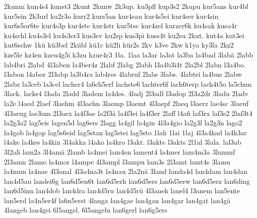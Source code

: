 {    2kunm
    kun4s4
    kunst3
    2kunt
    2kunw
    2k3up.
    ku3pfl
    kup3s2
    2kupu
    kur5ans
    kur4bl
    kur5ein
    2k3url
    ku2r3o
    kurr2
    kurs5an
    kur4sau
    kur4s5ei
    kur4ser
    kur4sin
    kur6s5or6te
    kur4s3p
    kur4ste
    kur4str
    kur5tsc
    kur4zel
    kurzer6k
    ku4sak
    kusa4r
    ku4schl
    ku4s3el
    ku4s3er3
    kus3ev
    ku2sp
    kus3pi
    kuss4t
    ku2su
    2kut.
    kut4a
    kut3ei
    kut6schw
    1kü
    kü3bel
    2kübl
    kü1c
    kü2li
    kür2s
    2kv
    k3ve
    2kw
    k1ya
    ky3la
    2kz2
    kze5le
    kz4en
    kzeu4g5i
    k3zu
    kzue4r3
    1la.
    1laa
    la3ar
    la3at
    la3ba
    la4bad
    3labä
    2labb
    lab4bri
    2labd
    4l3aben
    la4ber4z
    2labf
    2labg
    2labh
    l3a4b3i4t
    2la2bl
    2labn
    l3a4bo.
    l3abon
    l4abor
    2l3abp
    la3b4ra
    lab4res
    4labruf
    2labs
    3labs.
    4labtei
    la4bus
    2labw
    2labz
    la3ceb
    la3cel
    lacher4
    la6ch5erf
    lachste6
    lachter6f
    lach6terp
    lach4t5o
    la5chun
    3lack.
    lacks4
    l3ada
    2ladd
    3ladem
    la4des.
    4ladj
    2l3adl
    l3adop
    2l3a2dr
    3ladu
    2ladv
    la2e
    l4aed
    2laef
    3laehm
    4l3aehn
    3laemp
    l3aemt
    4l3aepf
    2laeq
    l3aerz
    lae4sc
    3laeuf
    4l3aeug
    lae3um
    2l3aex
    la4f3ae
    la2f3ä
    la4f3ei
    la4f3er
    2laff
    l4afi
    laf3ra
    laf3s2
    2laf3t4
    la2g3a2
    lag5eis
    lagen5d
    lag6ers
    2lagg
    la4gil
    la4gin
    4l3a4gio
    la2g3l
    la2g3n
    lago2
    la4gob
    la4gop
    lag5s6eid
    lag5stan
    lag5stei
    lag5sto
    1lah
    1lai
    1laj
    4l3a4kad
    la4k3ar
    l4ake
    la4kes
    la4kin
    3l4akka
    l4ako
    la4kro
    l3akt.
    l3akte
    l3akts
    2l1al
    3lala.
    lal3ab
    3l2ali
    lam2a
    3l4amä
    2lamb
    la4mei
    lam4en
    lament4
    la4mer
    lam4m3a
    3lammf
    2l3amn
    2lamo
    la4mor
    l4ampe
    4l3ampl
    l3ampu
    lam3s
    2l3amt
    lamt4s
    3lamu
    la4mun
    la4nae
    4l3anal
    4l3a4na3t
    la4nau
    2la2nä
    3land
    landa4d
    lan4dam
    lan4dan
    lan4d5au
    landei6g
    lan6d5en6t
    lan6d5erh
    lan6d5ers
    lan6d5erw
    lan6d5erz
    lan6ding
    lan6d5inn
    lan4dob
    lan4dra
    lan4d5ru
    lan4d5rü
    4l3anek
    lanel4
    l3anem
    lan5ente
    lan5erd
    la4n5er4f
    la6n5erst
    4langa
    lan4gae
    lan4gan
    lan4gar
    lan4gat
    lan4gä
    4langeb
    lan4gei
    6l5angel.
    6l5angeln
    lan6gerl
    lan6g5ers
}
